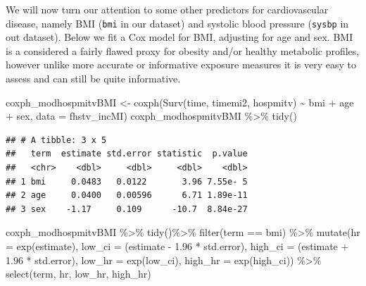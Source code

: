 \documentclass[
]{book}
\newenvironment{Shaded}{\begin{snugshade}}{\end{snugshade}}
\newcommand{\AttributeTok}[1]{\textcolor[rgb]{0.77,0.63,0.00}{#1}}
\newcommand{\FloatTok}[1]{\textcolor[rgb]{0.00,0.00,0.81}{#1}}
\newcommand{\FunctionTok}[1]{\textcolor[rgb]{0.00,0.00,0.00}{#1}}
\newcommand{\NormalTok}[1]{#1}
\newcommand{\OtherTok}[1]{\textcolor[rgb]{0.56,0.35,0.01}{#1}}
\newcommand{\SpecialCharTok}[1]{\textcolor[rgb]{0.00,0.00,0.00}{#1}}
\newcommand{\StringTok}[1]{\textcolor[rgb]{0.31,0.60,0.02}{#1}}
\begin{document}
We will now turn our attention to some other predictors for cardiovascular disease, namely BMI (\texttt{bmi} in our dataset) and systolic blood pressure (\texttt{sysbp} in out dataset). Below we fit a Cox model for BMI, adjusting for age and sex. BMI is a considered a fairly flawed proxy for obesity and/or healthy metabolic profiles, however unlike more accurate or informative exposure measures it is very easy to assess and can still be quite informative.

\begin{Shaded}
\begin{Highlighting}[]
\NormalTok{coxph\_modhospmitvBMI }\OtherTok{\textless{}{-}} \FunctionTok{coxph}\NormalTok{(}\FunctionTok{Surv}\NormalTok{(time, timemi2, hospmitv) }\SpecialCharTok{\textasciitilde{}}\NormalTok{ bmi }\SpecialCharTok{+}\NormalTok{ age }\SpecialCharTok{+}\NormalTok{ sex, }
                              \AttributeTok{data =}\NormalTok{ fhstv\_incMI)}
\NormalTok{coxph\_modhospmitvBMI }\SpecialCharTok{\%\textgreater{}\%}
  \FunctionTok{tidy}\NormalTok{()}
\end{Highlighting}
\end{Shaded}

\begin{verbatim}
## # A tibble: 3 x 5
##   term  estimate std.error statistic  p.value
##   <chr>    <dbl>     <dbl>     <dbl>    <dbl>
## 1 bmi     0.0483   0.0122       3.96 7.55e- 5
## 2 age     0.0400   0.00596      6.71 1.89e-11
## 3 sex    -1.17     0.109      -10.7  8.84e-27
\end{verbatim}

\begin{Shaded}
\begin{Highlighting}[]
\NormalTok{coxph\_modhospmitvBMI }\SpecialCharTok{\%\textgreater{}\%} 
  \FunctionTok{tidy}\NormalTok{()}\SpecialCharTok{\%\textgreater{}\%} 
  \FunctionTok{filter}\NormalTok{(term }\SpecialCharTok{==} \StringTok{\textquotesingle{}bmi\textquotesingle{}}\NormalTok{) }\SpecialCharTok{\%\textgreater{}\%}
  \FunctionTok{mutate}\NormalTok{(}\AttributeTok{hr =} \FunctionTok{exp}\NormalTok{(estimate),}
         \AttributeTok{low\_ci =}\NormalTok{ (estimate }\SpecialCharTok{{-}} \FloatTok{1.96} \SpecialCharTok{*}\NormalTok{ std.error), }
         \AttributeTok{high\_ci =}\NormalTok{ (estimate }\SpecialCharTok{+} \FloatTok{1.96} \SpecialCharTok{*}\NormalTok{ std.error), }
         \AttributeTok{low\_hr =} \FunctionTok{exp}\NormalTok{(low\_ci), }
         \AttributeTok{high\_hr =} \FunctionTok{exp}\NormalTok{(high\_ci)) }\SpecialCharTok{\%\textgreater{}\%} 
  \FunctionTok{select}\NormalTok{(term, hr, low\_hr, high\_hr)}
\end{Highlighting}
\end{Shaded}
\end{document}
